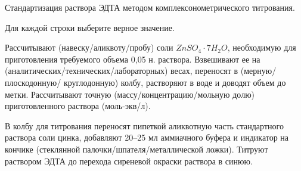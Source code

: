 
Стандартизация
раствора ЭДТА методом комплексонометрического титрования.

Для каждой строки выберите верное значение.

Рассчитывают (навеску/аликвоту/пробу) соли $ZnSO_4 \cdot 7H_2O$, необходимую для приготовления требуемого объема 0,05 н. 
раствора. Взвешивают ее на (аналитических/технических/лабораторных) весах, переносят в (мерную/плоскодонную/
круглодонную) колбу, растворяют в воде и доводят объем до метки. 
Рассчитывают точную (массу/концентрацию/мольную долю) приготовленного раствора (моль-экв/л). 

В колбу для титрования переносят пипеткой аликвотную часть стандартного раствора соли цинка, добавляют 
20–25 мл аммиачного буфера и индикатор на кончике (стеклянной палочки/шпателя/металлической ложки). Титруют раствором ЭДТА до перехода сиреневой 
окраски раствора в синюю.

